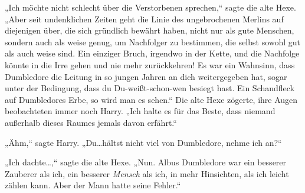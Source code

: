 „Ich möchte nicht schlecht über die Verstorbenen sprechen,“ sagte die alte Hexe.
„Aber seit undenklichen Zeiten geht die Linie des ungebrochenen Merlins auf diejenigen über, die sich gründlich bewährt haben, nicht nur als gute Menschen, sondern auch als weise genug, um Nachfolger zu bestimmen, die selbst sowohl gut als auch weise sind. Ein einziger Bruch, irgendwo in der Kette, und die Nachfolge könnte in die Irre gehen und nie mehr zurückkehren! Es war ein Wahnsinn, dass Dumbledore die Leitung in so jungen Jahren an dich weitergegeben hat, sogar unter der Bedingung, dass du Du-weißt-schon-wen besiegt hast. Ein Schandfleck auf Dumbledores Erbe, so wird man es sehen.“
Die alte Hexe zögerte, ihre Augen beobachteten immer noch Harry.
„Ich halte es für das Beste, dass niemand außerhalb dieses Raumes jemals davon erfährt.“

„Ähm,“ sagte Harry. „Du…hältst nicht viel von Dumbledore, nehme ich an?“

„Ich dachte…,“ sagte die alte Hexe. „Nun. Albus Dumbledore war ein besserer Zauberer als ich, ein besserer \emph{Mensch} als ich, in mehr Hinsichten, als ich leicht zählen kann. Aber der Mann hatte seine Fehler.“

